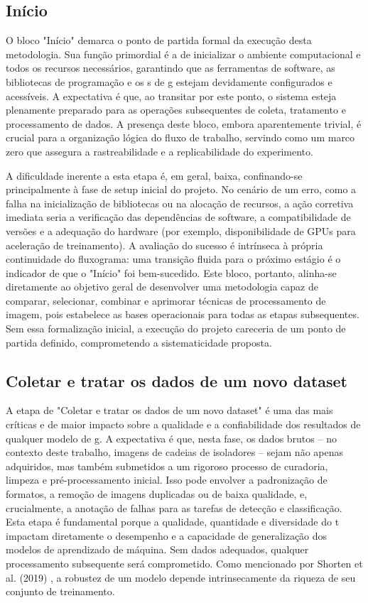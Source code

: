 \subsection{Início}
O bloco "Início" demarca o ponto de partida formal da execução desta metodologia. Sua função primordial é a de inicializar o ambiente computacional e todos os recursos necessários, garantindo que as ferramentas de software, as bibliotecas de programação e os s de g estejam devidamente configurados e acessíveis. A expectativa é que, ao transitar por este ponto, o sistema esteja plenamente preparado para as operações subsequentes de coleta, tratamento e processamento de dados. A presença deste bloco, embora aparentemente trivial, é crucial para a organização lógica do fluxo de trabalho, servindo como um marco zero que assegura a rastreabilidade e a replicabilidade do experimento.

A dificuldade inerente a esta etapa é, em geral, baixa, confinando-se principalmente à fase de setup inicial do projeto. No cenário de um erro, como a falha na inicialização de bibliotecas ou na alocação de recursos, a ação corretiva imediata seria a verificação das dependências de software, a compatibilidade de versões e a adequação do hardware (por exemplo, disponibilidade de GPUs para aceleração de treinamento). A avaliação do sucesso é intrínseca à própria continuidade do fluxograma: uma transição fluida para o próximo estágio é o indicador de que o "Início" foi bem-sucedido. Este bloco, portanto, alinha-se diretamente ao objetivo geral de desenvolver uma metodologia capaz de comparar, selecionar, combinar e aprimorar técnicas de processamento de imagem, pois estabelece as bases operacionais para todas as etapas subsequentes. Sem essa formalização inicial, a execução do projeto careceria de um ponto de partida definido, comprometendo a sistematicidade proposta.

\subsection{Coletar e tratar os dados de um novo dataset}
A etapa de "Coletar e tratar os dados de um novo dataset" é uma das mais críticas e de maior impacto sobre a qualidade e a confiabilidade dos resultados de qualquer modelo de g. A expectativa é que, nesta fase, os dados brutos -- no contexto deste trabalho, imagens de cadeias de isoladores -- sejam não apenas adquiridos, mas também submetidos a um rigoroso processo de curadoria, limpeza e pré-processamento inicial. Isso pode envolver a padronização de formatos, a remoção de imagens duplicadas ou de baixa qualidade, e, crucialmente, a anotação de falhas para as tarefas de detecção e classificação. Esta etapa é fundamental porque a qualidade, quantidade e diversidade do t impactam diretamente o desempenho e a capacidade de generalização dos modelos de aprendizado de máquina. Sem dados adequados, qualquer processamento subsequente será comprometido. Como mencionado por Shorten et al. (2019) \cite{Shorten2019}, a robustez de um modelo depende intrinsecamente da riqueza de seu conjunto de treinamento.

